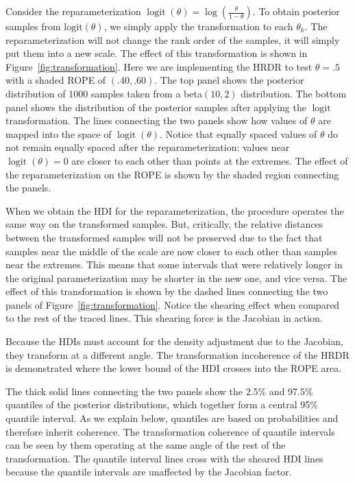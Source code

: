 \documentclass[9pt,twocolumn,twoside]{cidlab-draft}\templatetype{cidlab-invited}
\newcommand{\hdr}{HRDR}
\DeclareMathOperator*{\logit}{logit}
\begin{document}
Consider the reparameterization $\logit(\theta)=\log\left(\frac{\theta}{1-\theta}\right)$. To obtain posterior samples from $\text{logit}(\theta)$, we simply apply the transformation to each $\theta_k$. The reparameterization will not change the rank order of the samples, it will simply put them into a new scale. The effect of this transformation is shown in Figure~\ref{fig:transformation}. Here we are implementing the \hdr{} to test $\theta=.5$ with a shaded ROPE of $(.40, .60)$. The top panel shows the posterior distribution of 1000 samples taken from a beta$(10,2)$ distribution. The bottom panel shows the distribution of the posterior samples after applying the $\logit$ transformation. The lines connecting the two panels show how values of $\theta$ are mapped into the space of $\logit(\theta)$. Notice that equally spaced values of $\theta$ do not remain equally spaced after the reparameterization: values near $\logit(\theta)=0$ are closer to each other than points at the extremes. The effect of the reparameterization on the ROPE is shown by the shaded region connecting the panels. 

When we obtain the HDI for the reparameterization, the procedure operates the same way on the transformed samples. But, critically, the relative distances between the transformed samples will not be preserved due to the fact that samples near the middle of the scale are now closer to each other than samples near the extremes. This means that some intervals that were relatively longer in the original parameterization may be shorter in the new one, and vice versa. The effect of this transformation is shown by the dashed lines connecting the two panels of Figure~\ref{fig:transformation}. Notice the shearing effect when compared to the rest of the traced lines. This shearing force is the Jacobian in action. 

Because the HDIs must account for the density adjustment due to the Jacobian, they transform at a different angle. The transformation incoherence of the \hdr{} is demonstrated where the lower bound of the HDI crosses into the ROPE area. 

The thick solid lines connecting the two panels show the 2.5\% and 97.5\% quantiles of the posterior distributions, which together form a central 95\% quantile interval. As we explain below, quantiles are based on probabilities and therefore inherit coherence. The transformation coherence of quantile intervals can be seen by them operating at the same angle of the rest of the transformation. The quantile interval lines cross with the sheared HDI lines because the quantile intervals are unaffected by the Jacobian factor.
\end{document}
